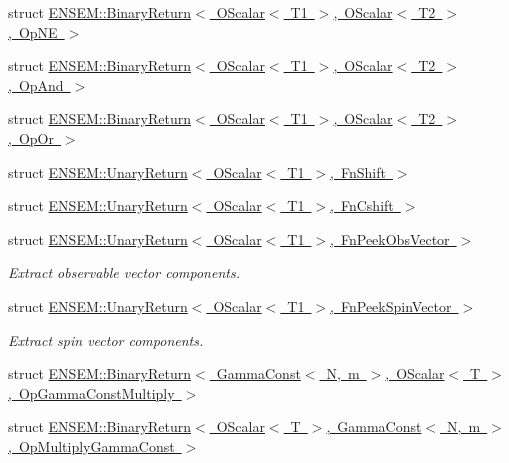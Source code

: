 \begin{DoxyCompactItemize}
\item 
struct \mbox{\hyperlink{structENSEM_1_1BinaryReturn_3_01OScalar_3_01T1_01_4_00_01OScalar_3_01T2_01_4_00_01OpNE_01_4}{E\+N\+S\+E\+M\+::\+Binary\+Return$<$ O\+Scalar$<$ T1 $>$, O\+Scalar$<$ T2 $>$, Op\+N\+E $>$}}
\item 
struct \mbox{\hyperlink{structENSEM_1_1BinaryReturn_3_01OScalar_3_01T1_01_4_00_01OScalar_3_01T2_01_4_00_01OpAnd_01_4}{E\+N\+S\+E\+M\+::\+Binary\+Return$<$ O\+Scalar$<$ T1 $>$, O\+Scalar$<$ T2 $>$, Op\+And $>$}}
\item 
struct \mbox{\hyperlink{structENSEM_1_1BinaryReturn_3_01OScalar_3_01T1_01_4_00_01OScalar_3_01T2_01_4_00_01OpOr_01_4}{E\+N\+S\+E\+M\+::\+Binary\+Return$<$ O\+Scalar$<$ T1 $>$, O\+Scalar$<$ T2 $>$, Op\+Or $>$}}
\item 
struct \mbox{\hyperlink{structENSEM_1_1UnaryReturn_3_01OScalar_3_01T1_01_4_00_01FnShift_01_4}{E\+N\+S\+E\+M\+::\+Unary\+Return$<$ O\+Scalar$<$ T1 $>$, Fn\+Shift $>$}}
\item 
struct \mbox{\hyperlink{structENSEM_1_1UnaryReturn_3_01OScalar_3_01T1_01_4_00_01FnCshift_01_4}{E\+N\+S\+E\+M\+::\+Unary\+Return$<$ O\+Scalar$<$ T1 $>$, Fn\+Cshift $>$}}
\item 
struct \mbox{\hyperlink{structENSEM_1_1UnaryReturn_3_01OScalar_3_01T1_01_4_00_01FnPeekObsVector_01_4}{E\+N\+S\+E\+M\+::\+Unary\+Return$<$ O\+Scalar$<$ T1 $>$, Fn\+Peek\+Obs\+Vector $>$}}
\begin{DoxyCompactList}\small\item\em Extract observable vector components. \end{DoxyCompactList}\item 
struct \mbox{\hyperlink{structENSEM_1_1UnaryReturn_3_01OScalar_3_01T1_01_4_00_01FnPeekSpinVector_01_4}{E\+N\+S\+E\+M\+::\+Unary\+Return$<$ O\+Scalar$<$ T1 $>$, Fn\+Peek\+Spin\+Vector $>$}}
\begin{DoxyCompactList}\small\item\em Extract spin vector components. \end{DoxyCompactList}\item 
struct \mbox{\hyperlink{structENSEM_1_1BinaryReturn_3_01GammaConst_3_01N_00_01m_01_4_00_01OScalar_3_01T_01_4_00_01OpGammaConstMultiply_01_4}{E\+N\+S\+E\+M\+::\+Binary\+Return$<$ Gamma\+Const$<$ N, m $>$, O\+Scalar$<$ T $>$, Op\+Gamma\+Const\+Multiply $>$}}
\item 
struct \mbox{\hyperlink{structENSEM_1_1BinaryReturn_3_01OScalar_3_01T_01_4_00_01GammaConst_3_01N_00_01m_01_4_00_01OpMultiplyGammaConst_01_4}{E\+N\+S\+E\+M\+::\+Binary\+Return$<$ O\+Scalar$<$ T $>$, Gamma\+Const$<$ N, m $>$, Op\+Multiply\+Gamma\+Const $>$}}

\end{DoxyCompactItemize}
